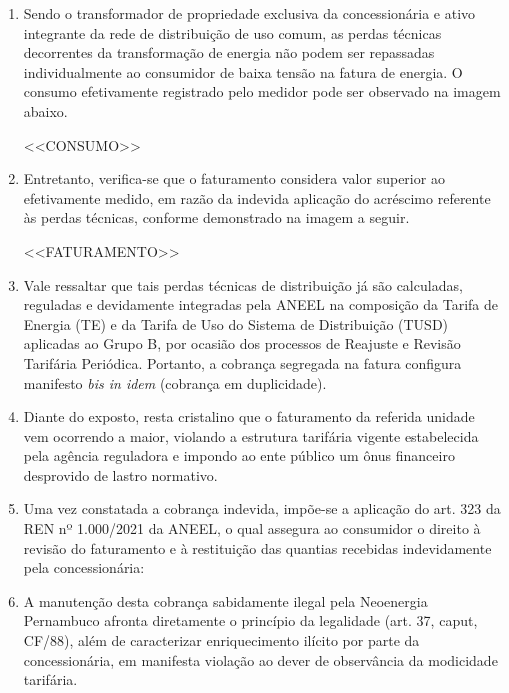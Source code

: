\begin{enumerate}[resume]
\item Sendo o transformador de propriedade exclusiva da concessionária e ativo integrante da rede de distribuição de uso comum, as perdas técnicas decorrentes da transformação de energia não podem ser repassadas individualmente ao consumidor de baixa tensão na fatura de energia. O consumo efetivamente registrado pelo medidor pode ser observado na imagem abaixo.

<<CONSUMO>>

\item Entretanto, verifica-se que o faturamento considera valor superior ao efetivamente medido, em razão da indevida aplicação do acréscimo referente às perdas técnicas, conforme demonstrado na imagem a seguir.

<<FATURAMENTO>>

\item Vale ressaltar que tais perdas técnicas de distribuição já são calculadas, reguladas e devidamente integradas pela ANEEL na composição da Tarifa de Energia (TE) e da Tarifa de Uso do Sistema de Distribuição (TUSD) aplicadas ao Grupo B, por ocasião dos processos de Reajuste e Revisão Tarifária Periódica. Portanto, a cobrança segregada na fatura configura manifesto \textit{bis in idem} (cobrança em duplicidade).

\item Diante do exposto, resta cristalino que o faturamento da referida unidade vem ocorrendo a maior, violando a estrutura tarifária vigente estabelecida pela agência reguladora e impondo ao ente público um ônus financeiro desprovido de lastro normativo.

\item Uma vez constatada a cobrança indevida, impõe-se a aplicação do art. 323 da REN nº 1.000/2021 da ANEEL, o qual assegura ao consumidor o direito à revisão do faturamento e à restituição das quantias recebidas indevidamente pela concessionária:


\item A manutenção desta cobrança sabidamente ilegal pela Neoenergia Pernambuco afronta diretamente o princípio da legalidade (art. 37, caput, CF/88), além de caracterizar enriquecimento ilícito por parte da concessionária, em manifesta violação ao dever de observância da modicidade tarifária.

\end{enumerate}

